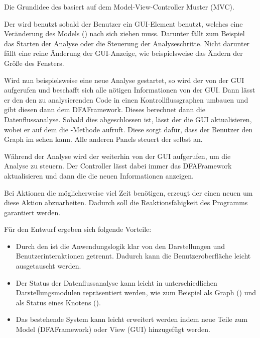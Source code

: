 Die Grundidee des  basiert auf dem Model-View-Controller Muster (MVC).

Der  wird benutzt sobald der Benutzer ein GUI-Element benutzt, welches eine Veränderung des Models () nach sich ziehen muss. Darunter fällt zum Beispiel das Starten der Analyse oder die Steuerung der Analyseschritte.
Nicht darunter fällt eine reine Änderung der GUI-Anzeige, wie beispielsweise das Ändern der Größe des Fensters.

Wird nun beispielsweise eine neue Analyse gestartet, so wird der  von der GUI aufgerufen und beschafft sich alle nötigen Informationen von der GUI.
Dann lässt er den  den zu analysierenden Code in einen Kontrollflussgraphen umbauen und gibt diesen dann dem DFAFramework. Dieses berechnet dann die Datenflussanalyse.
Sobald dies abgeschlossen ist, lässt der  die GUI aktualisieren, wobei er auf dem  die -Methode aufruft.
Diese sorgt dafür, dass der Benutzer den Graph im  sehen kann. Alle anderen Panels steuert der  selbst an.

Während der Analyse wird der  weiterhin von der GUI aufgerufen, um die Analyse zu steuern. Der Controller lässt dabei immer das DFAFramework aktualisieren und dann die  die neuen Informationen anzeigen.

Bei Aktionen die möglicherweise viel Zeit benötigen, erzeugt der  einen neuen  um diese Aktion abzuarbeiten.
Dadurch soll die Reaktionsfähigkeit des Programms garantiert werden.

Für den Entwurf ergeben sich folgende Vorteile:
\begin{itemize}
	\item Durch den  ist die Anwendungslogik klar von den Darstellungen und Benutzerinteraktionen getrennt.
	Dadurch kann die Benutzeroberfläche leicht ausgetauscht werden.
	\item Der Status der Datenflussanalyse kann leicht in unterschiedlichen Darstellungsmodulen repräsentiert werden, wie zum Beispiel als Graph () und als Status eines Knotens ().
	\item Das bestehende System kann leicht erweitert werden indem neue Teile zum Model (DFAFramework) oder View (GUI) hinzugefügt werden.
\end{itemize}

